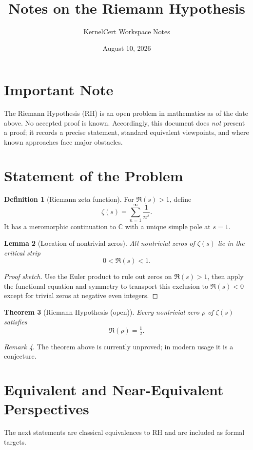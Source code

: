 \documentclass[11pt]{article}
\title{Notes on the Riemann Hypothesis}
\author{KernelCert Workspace Notes}
\date{August 10, 2026}
\theoremstyle{plain}
\newtheorem{theorem}{Theorem}[section]
\newtheorem{lemma}[theorem]{Lemma}
\theoremstyle{definition}
\newtheorem{definition}[theorem]{Definition}
\theoremstyle{remark}
\newtheorem{remark}[theorem]{Remark}
\begin{document}
\maketitle

\section*{Important Note}
The Riemann Hypothesis (RH) is an open problem in mathematics as of the date above.
No accepted proof is known.
Accordingly, this document does \emph{not} present a proof; it records a precise statement,
standard equivalent viewpoints, and where known approaches face major obstacles.

\section{Statement of the Problem}
\begin{definition}[Riemann zeta function]
For $\Re(s)>1$, define
\[
\zeta(s) = \sum_{n=1}^{\infty} \frac{1}{n^s}.
\]
It has a meromorphic continuation to $\mathbb{C}$ with a unique simple pole at $s=1$.
\end{definition}

\begin{lemma}[Location of nontrivial zeros]
All nontrivial zeros of $\zeta(s)$ lie in the critical strip
\[
0<\Re(s)<1.
\]
\end{lemma}

\begin{proof}[Proof sketch]
Use the Euler product to rule out zeros on $\Re(s)>1$, then apply the functional equation and
symmetry to transport this exclusion to $\Re(s)<0$ except for trivial zeros at negative even integers.
\end{proof}

\begin{theorem}[Riemann Hypothesis (open)]
Every nontrivial zero $\rho$ of $\zeta(s)$ satisfies
\[
\Re(\rho)=\tfrac12.
\]
\end{theorem}

\begin{remark}
The theorem above is currently unproved; in modern usage it is a conjecture.
\end{remark}

\section{Equivalent and Near-Equivalent Perspectives}
The next statements are classical equivalences to RH and are included as formal targets.
\end{document}

